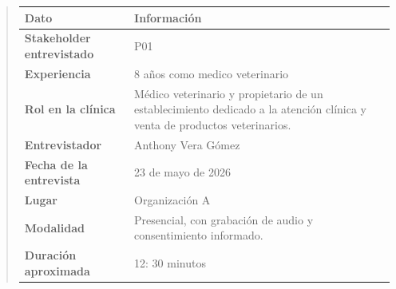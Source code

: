 \documentclass[
]{article}
\newcounter{none} %
\begin{document}
\begin{quote}
{\def\LTcaptype{none} %
\begin{longtable}[]{|
  >{\raggedright\arraybackslash}p{}|
  >{\raggedright\arraybackslash}p{}|}
\hline
\begin{minipage}[b]{\linewidth}\centering
\textbf{Dato}
\end{minipage} & \begin{minipage}[b]{\linewidth}\centering
\textbf{Información}
\end{minipage} \\
\hline
\endhead
\hline
\endlastfoot
\textbf{Stakeholder entrevistado} &
\begin{minipage}[t]{\linewidth}\raggedright
P01
\end{minipage} \\
\hline
\textbf{Experiencia} & \begin{minipage}[t]{\linewidth}\raggedright
8 años como medico veterinario
\end{minipage} \\
\hline
\textbf{Rol en la clínica} & \begin{minipage}[t]{\linewidth}\raggedright
Médico veterinario y propietario de un establecimiento dedicado a la
atención clínica y venta de productos veterinarios.
\end{minipage} \\
\hline
\textbf{Entrevistador} & \begin{minipage}[t]{\linewidth}\raggedright
Anthony Vera Gómez
\end{minipage} \\
\hline
\textbf{Fecha de la entrevista} &
\begin{minipage}[t]{\linewidth}\raggedright
23 de mayo de 2026
\end{minipage} \\
\hline
\textbf{Lugar} & \begin{minipage}[t]{\linewidth}\raggedright
Organización A
\end{minipage} \\
\hline
\textbf{Modalidad} & \begin{minipage}[t]{\linewidth}\raggedright
Presencial, con grabación de audio y consentimiento informado.
\end{minipage} \\
\hline
\textbf{Duración aproximada} &
\begin{minipage}[t]{\linewidth}\raggedright
12: 30 minutos
\end{minipage} \\

\end{longtable}}
\end{quote}
\end{document}
